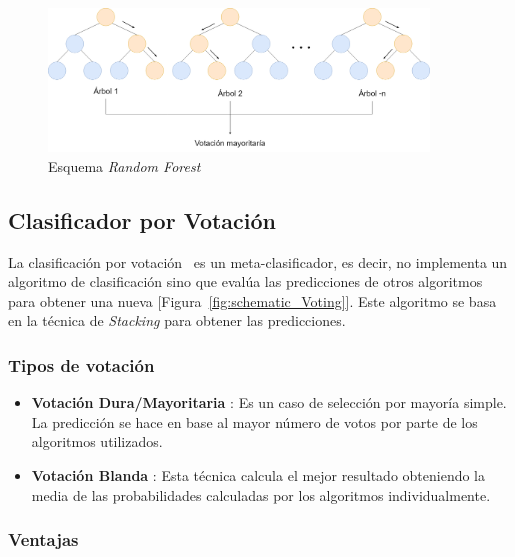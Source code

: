 \begin{figure}[h]
    \centering
    \includegraphics[width=0.9\textwidth, keepaspectratio]{imaxes/random_forest.png}
    \caption{Esquema \textit{Random Forest}}
    \label{fig:schematic_RandomForest}
\end{figure}






\subsection{Clasificador por Votación} 
\label{sec:voting_clf}

La clasificación por votación~\cite{voting_clf} es un meta-clasificador, es decir, no implementa un algoritmo de clasificación sino que evalúa las predicciones de otros algoritmos para obtener una nueva [Figura~\ref{fig:schematic_Voting}]. Este algoritmo se basa en la técnica de \textit{Stacking} para obtener las predicciones.

\subsubsection{Tipos de votación}

\begin{itemize}
    \item \textbf{Votación Dura/Mayoritaria} :  Es un caso de selección por mayoría simple. La predicción se hace en base al mayor número de votos por parte de los algoritmos utilizados.
    
    \item \textbf{Votación Blanda} : Esta técnica calcula el mejor resultado obteniendo la media de las probabilidades calculadas por los algoritmos individualmente.
\end{itemize}

\subsubsection{Ventajas}

